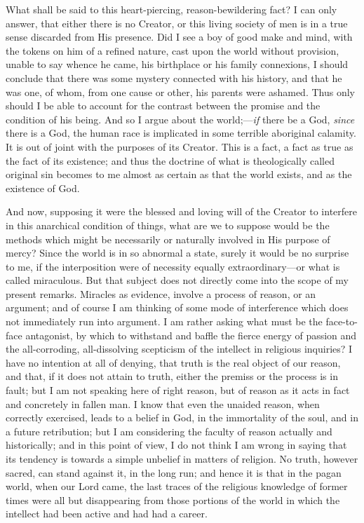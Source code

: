 What shall be said to this heart-piercing, reason-bewildering fact? I
can only answer, that either there is no Creator, or this living society
of men is in a true sense discarded from His presence. Did I see a boy
of good make and mind, with the tokens on him of a refined nature, cast
upon the world without provision, unable to say whence he came, his
birthplace or his family connexions, I should conclude that there was
some mystery connected with his history, and that he was one, of whom,
from one cause or other, his parents were ashamed. Thus only should I be
able to account for the contrast between the promise and the
condition of his being. And so I argue about the world;—\emph{if}
there be a God, \emph{since} there is a God, the human race is
implicated in some terrible aboriginal calamity. It is out of joint with
the purposes of its Creator. This is a fact, a fact as true as the fact
of its existence; and thus the doctrine of what is theologically called
original sin becomes to me almost as certain as that the world exists,
and as the existence of God.

And now, supposing it were the blessed and loving will of the Creator
to interfere in this anarchical condition of things, what are we to
suppose would be the methods which might be necessarily or naturally
involved in His purpose of mercy? Since the world is in so
abnormal a state, surely it would be no surprise to me, if the
interposition were of necessity equally extraordinary—or what is
called miraculous. But that subject does not directly come into the
scope of my present remarks. Miracles as evidence, involve a process
of reason, or an argument; and of course I am thinking of some mode of
interference which does not immediately run into argument. I am rather
asking what must be the face-to-face antagonist, by which to withstand
and baffle the fierce energy of passion and the all-corroding,
all-dissolving scepticism of the intellect in religious inquiries? I
have no intention at all of denying, that truth is the real
object of our reason, and that, if it does not attain to truth, either
the premiss or the process is in fault; but I am not speaking here of right reason, but of reason as it acts in fact and
concretely in fallen man. I know that even the unaided reason, when
correctly exercised, leads to a belief in God, in the immortality of the
soul, and in a future retribution; but I am considering the faculty of
reason actually and historically; and in this point of view, I do not think I
am wrong in saying that its tendency is towards a simple unbelief in
matters of religion. No truth, however sacred, can stand against it, in
the long run; and hence it is that in the pagan world, when our Lord
came, the last traces of the religious knowledge of former times were
all but disappearing from those portions of the world in which the
intellect had been active and had had a career.

